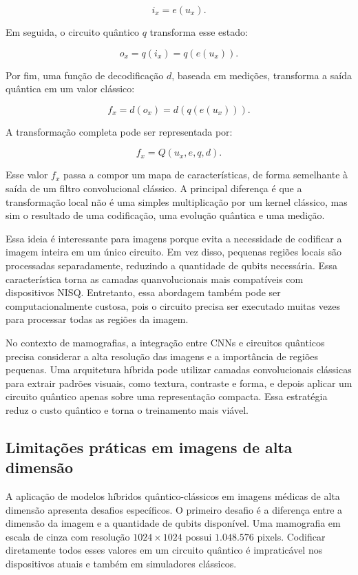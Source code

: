 \documentclass[
    12pt,
    openright,
    oneside,
    a4paper,
    english,
    brazil
]{abntex2}
\begin{document}
\[
i_x = e(u_x).
\]

Em seguida, o circuito quântico \(q\) transforma esse estado:

\[
o_x = q(i_x) = q(e(u_x)).
\]

Por fim, uma função de decodificação \(d\), baseada em medições, transforma a saída quântica em um valor clássico:

\[
f_x = d(o_x) = d(q(e(u_x))).
\]

A transformação completa pode ser representada por:

\[
f_x = Q(u_x, e, q, d).
\]

Esse valor \(f_x\) passa a compor um mapa de características, de forma semelhante à saída de um filtro convolucional clássico. A principal diferença é que a transformação local não é uma simples multiplicação por um kernel clássico, mas sim o resultado de uma codificação, uma evolução quântica e uma medição.

Essa ideia é interessante para imagens porque evita a necessidade de codificar a imagem inteira em um único circuito. Em vez disso, pequenas regiões locais são processadas separadamente, reduzindo a quantidade de qubits necessária. Essa característica torna as camadas quanvolucionais mais compatíveis com dispositivos NISQ. Entretanto, essa abordagem também pode ser computacionalmente custosa, pois o circuito precisa ser executado muitas vezes para processar todas as regiões da imagem.

No contexto de mamografias, a integração entre CNNs e circuitos quânticos precisa considerar a alta resolução das imagens e a importância de regiões pequenas. Uma arquitetura híbrida pode utilizar camadas convolucionais clássicas para extrair padrões visuais, como textura, contraste e forma, e depois aplicar um circuito quântico apenas sobre uma representação compacta. Essa estratégia reduz o custo quântico e torna o treinamento mais viável.

\subsection{Limitações práticas em imagens de alta dimensão}

A aplicação de modelos híbridos quântico-clássicos em imagens médicas de alta dimensão apresenta desafios específicos. O primeiro desafio é a diferença entre a dimensão da imagem e a quantidade de qubits disponível. Uma mamografia em escala de cinza com resolução \(1024 \times 1024\) possui \(1.048.576\) pixels. Codificar diretamente todos esses valores em um circuito quântico é impraticável nos dispositivos atuais e também em simuladores clássicos.
\end{document}
